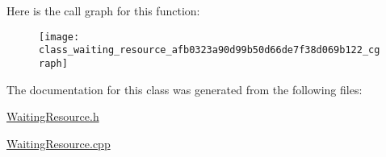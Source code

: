 Here is the call graph for this function\-:\nopagebreak
\begin{figure}[H]
\begin{center}
\leavevmode
\texttt{[image: class\_waiting\_resource\_afb0323a90d99b50d66de7f38d069b122\_cgraph]}
\end{center}
\end{figure}




The documentation for this class was generated from the following files\-:\begin{DoxyCompactItemize}
\item 
\hyperlink{_waiting_resource_8h}{Waiting\-Resource.\-h}\item 
\hyperlink{_waiting_resource_8cpp}{Waiting\-Resource.\-cpp}\end{DoxyCompactItemize}
